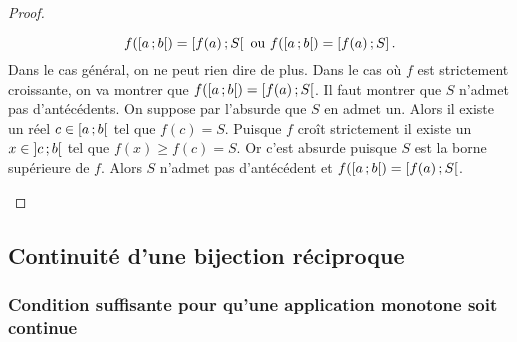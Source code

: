 \begin{proof}
\begin{enumerate}
\begin{equation}
      f(\left[ a \, ;  b \right[) = \left[ f(a) \, ;  S \right[ \text{~ou~} f(\left[ a \, ;  b \right[) = \left[ f(a) \, ;  S \right].
    \end{equation}
    Dans le cas général, on ne peut rien dire de plus. Dans le cas où $f$ est strictement croissante, on va montrer que $f(\left[ a \, ;  b \right[) = \left[ f(a) \, ;  S \right[$. Il faut montrer que $S$ n'admet pas d'antécédents. On suppose par l'absurde que $S$ en admet un. Alors il existe un réel $c \in \left[ a \, ;  b \right[$ tel que $f(c)=S$. Puisque $f$ croît strictement il existe un $x \in \left] c \, ;  b \right[$ tel que $f(x) \geqslant f(c)=S$. Or c'est absurde puisque $S$ est la borne supérieure de $f$. Alors $S$ n'admet pas d'antécédent et $f(\left[ a \, ;  b \right[) = \left[ f(a) \, ;  S \right[$.
  \end{enumerate}
\end{proof}

\subsection{Continuité d'une bijection réciproque}

\subsubsection[Pour qu'une application monotone soit continue]{Condition suffisante pour qu'une application monotone soit continue}

